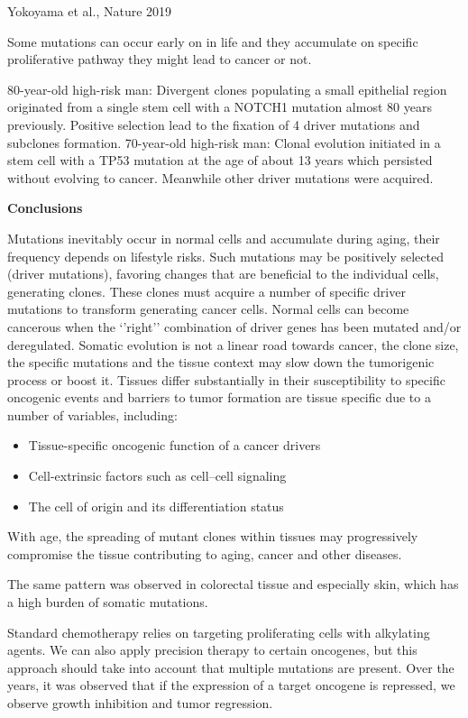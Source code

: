 Yokoyama et al., Nature 2019

Some mutations can occur early on in life and they accumulate on specific proliferative pathway they might lead to cancer or not.

80-year-old high-risk man: Divergent clones populating a small epithelial region originated from a single stem cell with a NOTCH1 mutation almost 80 years previously. Positive selection lead to the fixation of 4 driver mutations and subclones formation.
70-year-old high-risk man: Clonal evolution initiated in a stem cell with a TP53 mutation at the age of about 13 years which persisted without evolving to cancer. Meanwhile other driver mutations were acquired.

\textbf{Conclusions}

Mutations inevitably occur in normal cells and accumulate during aging, their frequency depends on lifestyle risks. Such mutations may be positively selected (driver mutations), favoring changes that are beneficial to the individual cells, generating clones. These clones must acquire a number of specific driver mutations to transform generating cancer cells. Normal cells can become cancerous when the `'right'' combination of driver genes has been mutated and/or deregulated. Somatic evolution is not a linear road towards cancer, the clone size, the specific mutations and the tissue context may slow down the tumorigenic process or boost it. Tissues differ substantially in their susceptibility to specific oncogenic events and barriers to tumor formation are tissue specific due to a number of variables, including:

\begin{itemize}
\tightlist
\item
  Tissue-specific oncogenic function of a cancer drivers
\item
  Cell-extrinsic factors such as cell--cell signaling
\item
  The cell of origin and its differentiation status
\end{itemize}

With age, the spreading of mutant clones within tissues may progressively compromise the tissue contributing to aging, cancer and other diseases.

The same pattern was observed in colorectal tissue and especially skin, which has a high burden of somatic mutations.

Standard chemotherapy relies on targeting proliferating cells with alkylating agents. We can also apply precision therapy to certain oncogenes, but this approach should take into account that multiple mutations are present. Over the years, it was observed that if the expression of a target oncogene is repressed, we observe growth inhibition and tumor regression.

